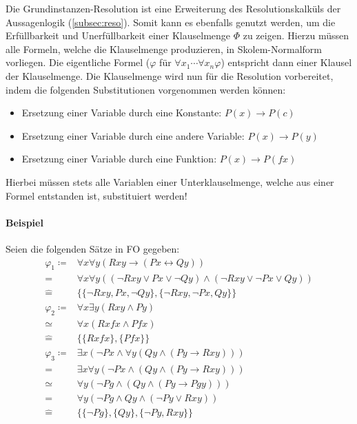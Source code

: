 \documentclass[a4paper, 11pt, accentcolor = tud3b]{tudreport}
\begin{document}
                Die Grundinstanzen-Resolution ist eine Erweiterung des Resolutionskalküls der Aussagenlogik (\ref{subsec:reso}). Somit kann es ebenfalls genutzt werden, um die Erfüllbarkeit und Unerfüllbarkeit einer Klauselmenge $ \Phi $ zu zeigen. Hierzu müssen alle Formeln, welche die Klauselmenge produzieren, in Skolem-Normalform vorliegen. Die eigentliche Formel ($ \varphi $ für $ \forall x _ 1 \cdots \forall x _ n \varphi $) entspricht dann einer Klausel der Klauselmenge. Die Klauselmenge wird nun für die Resolution vorbereitet, indem die folgenden Substitutionen vorgenommen werden können:
                \begin{itemize}
                    \item Ersetzung einer Variable durch eine Konstante: $ P(x) \rightarrow P(c) $
                    \item Ersetzung einer Variable durch eine andere Variable: $ P(x) \rightarrow P(y) $
                    \item Ersetzung einer Variable durch eine Funktion: $ P(x) \rightarrow P(fx) $
                \end{itemize}
                Hierbei müssen stets alle Variablen einer Unterklauselmenge, welche aus einer Formel entstanden ist, substituiert werden!

                \paragraph{Beispiel}
                    Seien die folgenden Sätze in FO gegeben:
                    \begin{align*}
                        \varphi _ 1 \coloneqq& \forall x \forall y (Rxy \rightarrow (Px \leftrightarrow Qy)) \\
                                    =& \forall x \forall y ((\lnot Rxy \lor Px \lor \lnot Qy) \land (\lnot Rxy \lor \lnot Px \lor Qy)) \\
                                    \hat=& \{ \{ \lnot Rxy, Px, \lnot Qy \}, \{ \lnot Rxy, \lnot Px, Qy \} \} \\
                        \varphi _ 2 \coloneqq& \forall x \exists y (Rxy \land Py) \\
                                    \simeq& \forall x (Rxfx \land Pfx) \\
                                    \hat=& \{ \{ Rxfx \}, \{ Pfx \} \} \\
                        \varphi _ 3 \coloneqq& \exists x (\lnot Px \land \forall y (Qy \land (Py \rightarrow Rxy))) \\
                                    =& \exists x \forall y (\lnot Px \land (Qy \land (Py \rightarrow Rxy))) \\
                                    \simeq& \forall y (\lnot Pg \land (Qy \land (Py \rightarrow Pgy))) \\
                                    =& \forall y (\lnot Pg \land Qy \land (\lnot Py \lor Rxy)) \\
                                    \hat=& \{ \{ \lnot Pg \}, \{ Qy \}, \{ \lnot Py, Rxy \} \} \\
                    \end{align*}
\end{document}
